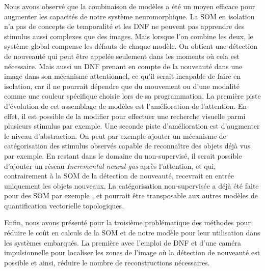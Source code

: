 Nous avons observé que la combinaison de modèles a été un moyen efficace pour augmenter les capacités de notre système neuromorphique. La SOM en isolation n'a pas de concepts de temporalité et les DNF ne peuvent pas apprendre des stimulus aussi complexes que des images. Mais lorsque l'on combine les deux, le système global compense les défauts de chaque modèle. On obtient une détection de nouveauté qui peut être appelée seulement dans les moments où cela est nécessaire. Mais aussi un DNF prenant en compte de la nouveauté dans une image dans son mécanisme attentionnel, ce qu'il serait incapable de faire en isolation, car il ne pourrait dépendre que du mouvement ou d'une modalité comme une couleur spécifique choisie lors de sa programmation. La première piste d'évolution de cet assemblage de modèles est l'amélioration de l'attention. En effet, il est possible de la modifier pour effectuer une recherche visuelle parmi plusieurs stimulus \cite{fix2011dynamic} par exemple. Une seconde piste d'amélioration est d'augmenter le niveau d'abstraction. On peut par exemple ajouter un mécanisme de catégorisation des stimulus observés capable de reconnaître des objets déjà vus par exemple. En restant dans le domaine du non-supervisé, il serait possible d'ajouter un réseau \textit{Incremental neural gas} après l'attention, et qui, contrairement à la SOM de la détection de nouveauté, recevrait en entrée uniquement les objets nouveaux. La catégorisation non-supervisée a déjà été faite pour des SOM par exemple \cite{khacef2019self}, et pourrait être transposable aux autres modèles de quantification vectorielle topologiques.

Enfin, nous avons présenté pour la troisième problématique des méthodes pour réduire le coût en calculs de la SOM et de notre modèle pour leur utilisation dans les systèmes embarqués. La première avec l'emploi de DNF et d'une caméra impulsionnelle pour localiser les zones de l'image où la détection de nouveauté est possible et ainsi, réduire le nombre de reconstructions nécessaires. 

